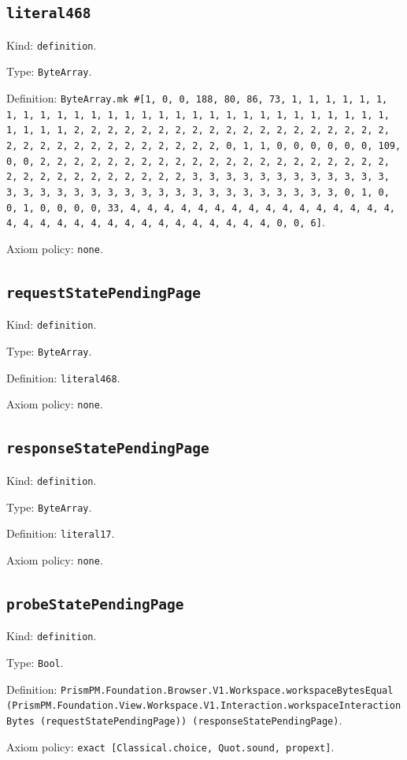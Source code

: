 \documentclass[11pt]{article}
\begin{document}
\subsection*{\texttt{literal468}}
\noindent Kind: \texttt{definition}.\par
\noindent Type: \texttt{ByteArray}.\par
\noindent Definition: \texttt{ByteArray.mk \#[1, 0, 0, 188, 80, 86, 73, 1, 1, 1, 1, 1, 1, 1, 1, 1, 1, 1, 1, 1, 1, 1, 1, 1, 1, 1, 1, 1, 1, 1, 1, 1, 1, 1, 1, 1, 1, 1, 1, 1, 2, 2, 2, 2, 2, 2, 2, 2, 2, 2, 2, 2, 2, 2, 2, 2, 2, 2, 2, 2, 2, 2, 2, 2, 2, 2, 2, 2, 2, 2, 2, 2, 0, 1, 1, 0, 0, 0, 0, 0, 0, 109, 0, 0, 2, 2, 2, 2, 2, 2, 2, 2, 2, 2, 2, 2, 2, 2, 2, 2, 2, 2, 2, 2, 2, 2, 2, 2, 2, 2, 2, 2, 2, 2, 2, 2, 3, 3, 3, 3, 3, 3, 3, 3, 3, 3, 3, 3, 3, 3, 3, 3, 3, 3, 3, 3, 3, 3, 3, 3, 3, 3, 3, 3, 3, 3, 3, 3, 0, 1, 0, 0, 1, 0, 0, 0, 0, 33, 4, 4, 4, 4, 4, 4, 4, 4, 4, 4, 4, 4, 4, 4, 4, 4, 4, 4, 4, 4, 4, 4, 4, 4, 4, 4, 4, 4, 4, 4, 4, 4, 0, 0, 6]}.\par
\noindent Axiom policy: \texttt{none}.\par
\subsection*{\texttt{requestStatePendingPage}}
\noindent Kind: \texttt{definition}.\par
\noindent Type: \texttt{ByteArray}.\par
\noindent Definition: \texttt{literal468}.\par
\noindent Axiom policy: \texttt{none}.\par
\subsection*{\texttt{responseStatePendingPage}}
\noindent Kind: \texttt{definition}.\par
\noindent Type: \texttt{ByteArray}.\par
\noindent Definition: \texttt{literal17}.\par
\noindent Axiom policy: \texttt{none}.\par
\subsection*{\texttt{probeStatePendingPage}}
\noindent Kind: \texttt{definition}.\par
\noindent Type: \texttt{Bool}.\par
\noindent Definition: \texttt{PrismPM.Foundation.Browser.V1.Workspace.workspaceBytesEqual (PrismPM.Foundation.View.Workspace.V1.Interaction.workspaceInteractionBytes (requestStatePendingPage)) (responseStatePendingPage)}.\par
\noindent Axiom policy: \texttt{exact [Classical.choice, Quot.sound, propext]}.\par
\end{document}

